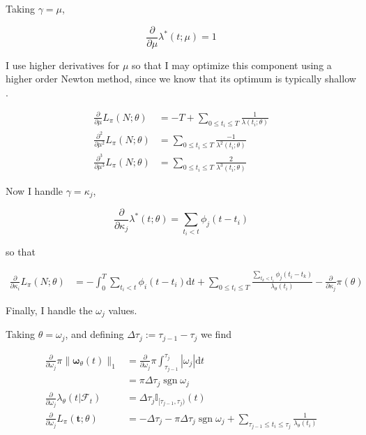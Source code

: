 \documentclass[11pt]{article}
\def\lt{<}
\newcommand{\dd}{\mathrm{d}}
\newcommand{\bb}[1]{\mathbb{#1}}
\renewcommand{\v}[1]{\boldsymbol{#1}}
\newcommand{\oo}[1]{\operatorname{#1}}
\begin{document}
    Taking \(\gamma=\mu\),

\[{ \scriptstyle \frac{\partial}{\partial\mu} }\lambda^*(t;\mu) = 1\]

I use higher derivatives for \(\mu\) so that I may optimize this
component using a higher order Newton method, since we know that its
optimum is typically shallow \cite{veen_estimation_2008}.

\[\begin{aligned}
  { \scriptstyle \frac{\partial}{\partial\mu} } L_\pi(N;\theta) &=-T + \sum_{0\leq t_i\leq T} \frac{1}{\lambda(t_i;\theta)} \\
  { \scriptstyle \frac{\partial^2}{\partial\mu^2} } L_\pi(N;\theta) &= \sum_{0\leq t_i\leq T} \frac{-1}{\lambda^2(t_i;\theta)}\\
  { \scriptstyle \frac{\partial^3}{\partial\mu^3} } L_\pi(N;\theta) &= \sum_{0\leq t_i\leq T} \frac{2}{\lambda^3(t_i;\theta)}
  \end{aligned}\]

    Now I handle \(\gamma=\kappa_j\),

\[{ \scriptstyle \frac{\partial}{\partial\kappa_j} }\lambda^*(t;\theta) =  \sum_{t_i\lt t}\phi_j(t-t_i)\]

so that

\[\begin{aligned}
  { \scriptstyle \frac{\partial}{\partial\kappa_i} } L_\pi(N; \theta)&=-\int_0^T \sum_{t_i\lt t}\phi_i(t-t_i) \dd t + \sum_{0\leq t_i\leq T} \frac{\sum_{t_k\lt t_i}\phi_j(t_i-t_k)}{\lambda_\theta(t_i)} -\frac{\partial}{\partial\kappa_j}\pi(\theta)
\end{aligned}\]

    Finally, I handle the \(\omega_j\) values.

Taking \(\theta=\omega_j\), and defining
\(\Delta\tau_j:= {\tau_{j-1}}-{\tau_j}\) we find

\[\begin{aligned}
{ \scriptstyle \frac{\partial}{\partial\omega_j} }\pi\|\v \omega_\theta(t)\|_1 &= { \scriptstyle \frac{\partial}{\partial\omega_j} }\pi \int_{\tau_{j-1}}^{\tau_j} \left|\omega_j\right|\dd t\\
&=\pi\Delta\tau_j\oo{sgn} \omega_j\\
{ \scriptstyle \frac{\partial}{\partial\omega_j} }\lambda_\theta(t|\mathcal{F}_t) &=  \Delta\tau_j\bb{I}_{[\tau_{j-1},\tau_j)}(t)\\
{ \scriptstyle \frac{\partial}{\partial\omega_j} } L_\pi(\v t;\theta) &=-\Delta\tau_j-\pi\Delta\tau_j\oo{sgn} \omega_j + \sum_{\tau_{j-1}\leq t_i\leq \tau_j} \frac{1}{\lambda_\theta(t_i)}
\end{aligned}\]
\end{document}
